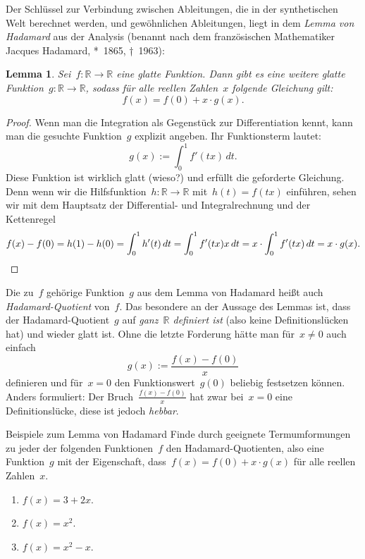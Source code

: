 \documentclass[twoside]{../zirkelblatt}
\newcommand{\RR}{\mathbb{R}}
\theoremstyle{definition}
\theoremstyle{plain}
\newtheorem{lemma}[defn]{Lemma}
\theoremstyle{remark}
\begin{document}
Der Schlüssel zur Verbindung zwischen Ableitungen, die in der synthetischen
Welt berechnet werden, und gewöhnlichen Ableitungen, liegt in dem \emph{Lemma
von Hadamard} aus der Analysis (benannt nach dem französischen Mathematiker
Jacques Hadamard, *~1865, †~1963):

\begin{lemma}Sei~$f : \RR \to \RR$ eine glatte Funktion. Dann gibt es eine
weitere glatte Funktion~$g : \RR \to \RR$, sodass für alle reellen Zahlen~$x$
folgende Gleichung gilt:
\[ f(x) = f(0) + x \cdot g(x). \]
\end{lemma}
\begin{proof}Wenn man die Integration als Gegenstück zur Differentiation kennt,
kann man die gesuchte Funktion~$g$ explizit angeben. Ihr Funktionsterm lautet:
\[ g(x) := \int_0^1 f'(tx) \, dt. \]
Diese Funktion ist wirklich glatt (wieso?) und erfüllt die geforderte
Gleichung. Denn wenn wir die Hilfsfunktion~$h : \RR \to \RR$ mit~$h(t) = f(tx)$
einführen, sehen wir mit dem Hauptsatz der Differential- und Integralrechnung
und der Kettenregel
\[
  f(x) - f(0) = h(1) - h(0) =
  \int_0^1 h'(t) \,dt
  = \int_0^1 f'(tx) x \,dt
  = x \cdot \int_0^1 f'(tx) \,dt
  = x \cdot g(x). \qedhere
\]
\end{proof}

Die zu~$f$ gehörige Funktion~$g$ aus dem Lemma von Hadamard heißt auch
\emph{Hadamard-Quotient} von~$f$. Das besondere an der Aussage des Lemmas ist,
dass der Hadamard-Quotient~$g$ auf \emph{ganz~$\RR$ definiert ist} (also keine
Definitionslücken hat) und wieder glatt ist. Ohne
die letzte Forderung hätte man für~$x \neq 0$ auch einfach
\[ g(x) := \frac{f(x) - f(0)}{x} \]
definieren und für~$x = 0$ den Funktionswert~$g(0)$ beliebig festsetzen können.
Anders formuliert: Der Bruch~$\frac{f(x) - f(0)}{x}$ hat zwar bei~$x = 0$ eine
Definitionslücke, diese ist jedoch \emph{hebbar}.

\begin{aufgabeShaded}{Beispiele zum Lemma von Hadamard}
Finde durch geeignete Termumformungen zu jeder der folgenden Funktionen~$f$ den
Hadamard-Quotienten, also eine Funktion~$g$ mit der Eigenschaft, dass~$f(x) =
f(0) + x \cdot g(x)$ für alle reellen Zahlen~$x$.
\begin{enumerate}
\item $f(x) = 3 + 2x$.
\item $f(x) = x^2$.
\item $f(x) = x^2 - x$.
\end{enumerate}
\end{aufgabeShaded}
\end{document}

